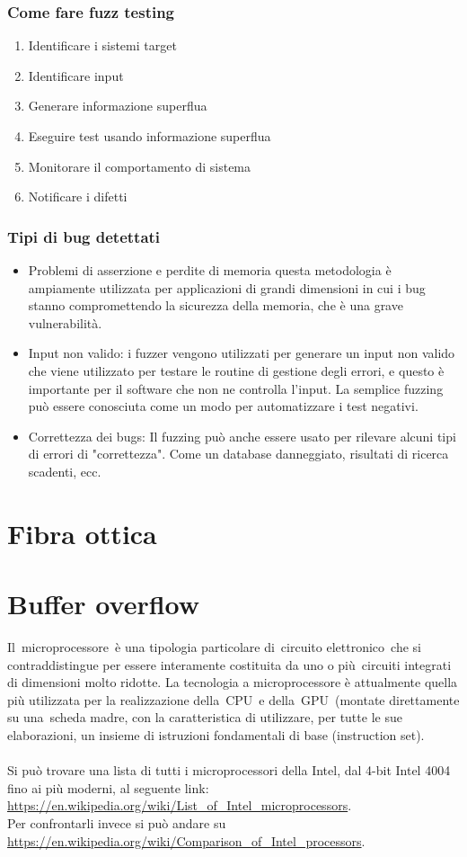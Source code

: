 \documentclass[8pt]{extarticle}
\begin{document}
\subsubsection{Come fare fuzz testing}
\begin{enumerate}
    \item Identificare i sistemi target
    \item Identificare input
    \item Generare informazione superflua
    \item Eseguire test usando informazione superflua
    \item Monitorare il comportamento di sistema
    \item Notificare i difetti
\end{enumerate}
\subsubsection{Tipi di bug detettati}
\begin{itemize}
    \item Problemi di asserzione e perdite di memoria questa metodologia è ampiamente utilizzata per 
    applicazioni di grandi dimensioni in cui i bug stanno compromettendo la sicurezza della memoria, 
    che è una grave vulnerabilità.
    \item Input non valido: i fuzzer vengono utilizzati per generare un input non valido che viene 
    utilizzato per testare le routine di gestione degli errori, e questo è importante per il software 
    che non ne controlla l'input. La semplice fuzzing può essere conosciuta come un modo per 
    automatizzare i test negativi.
    \item Correttezza dei bugs: Il fuzzing può anche essere usato per rilevare alcuni tipi di errori 
    di "correttezza". Come un database danneggiato, risultati di ricerca scadenti, ecc.
\end{itemize}
\section{Fibra ottica}

\section{Buffer overflow}
Il microprocessore è una tipologia particolare di circuito elettronico che si contraddistingue per 
essere interamente costituita da uno o più circuiti integrati di dimensioni molto ridotte. 
La tecnologia a microprocessore è attualmente quella più utilizzata per la realizzazione della CPU e 
della GPU (montate direttamente su una scheda madre, con la caratteristica di utilizzare, per tutte 
le sue elaborazioni, un insieme di istruzioni fondamentali di base (instruction set).\\\\
Si può trovare una lista di tutti i microprocessori della Intel, dal 4-bit Intel 4004 fino ai più 
moderni, al seguente link: \url{https://en.wikipedia.org/wiki/List_of_Intel_microprocessors}. \\
Per confrontarli invece si può andare su \url{https://en.wikipedia.org/wiki/Comparison_of_Intel_processors}.
\end{document}
